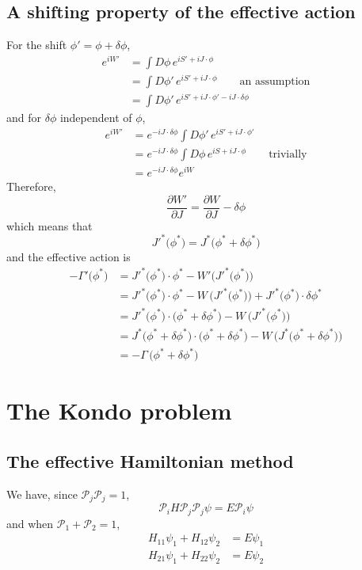 \documentclass[12pt, oneside]{book}
\begin{document}
\section*{A shifting property of the effective action}
For the shift $\phi'=\phi+\delta\phi$,
\begin{align*}
e^{iW'}
&=\int D\phi\,e^{iS'+iJ\cdot\phi}\\
&=\int D\phi'\,e^{iS'+iJ\cdot\phi}\qquad
\text{an assumption}\\
&=\int D\phi'\,e^{iS'+iJ\cdot\phi'-iJ\cdot\delta\phi}
\end{align*}
and for $\delta\phi$ independent of $\phi$,
\begin{align*}
e^{iW'}
&=e^{-iJ\cdot\delta\phi}\int D\phi'\,e^{iS'+iJ\cdot\phi'}\\
&=e^{-iJ\cdot\delta\phi}\int D\phi\,e^{iS+iJ\cdot\phi}\qquad
\text{trivially}\\
&=e^{-iJ\cdot\delta\phi}e^{iW}
\end{align*}
Therefore,
\[
\frac{\partial W'}{\partial J}=\frac{\partial W}{\partial J}-\delta\phi
\]
which means that
\[
J'^*\big(\phi^*\big)=J^*\big(\phi^*+\delta\phi^*\big)
\]
and the effective action is
\begin{align*}
-\Gamma'\big(\phi^*\big)
&=J'^*\big(\phi^*\big)\cdot\phi^*-W'\big(J'^*\big(\phi^*\big)\big)\\
&=J'^*\big(\phi^*\big)\cdot\phi^*-W\,\big(J'^*\big(\phi^*\big)\big)+J'^*\big(\phi^*\big)\cdot\delta\phi^*\\
&=J'^*\big(\phi^*\big)\cdot\big(\phi^*+\delta\phi^*\big)-W\,\big(J'^*\big(\phi^*\big)\big)\\
&=J^*\big(\phi^*+\delta\phi^*\big)\cdot\big(\phi^*+\delta\phi^*\big)-W\,\big(J^*\big(\phi^*+\delta\phi^*\big)\big)\\
&=-\Gamma\,\big(\phi^*+\delta\phi^*\big)
\end{align*}

\chapter{The Kondo problem}
\section*{The effective Hamiltonian method}
We have, since $\mathcal{P}_j\mathcal{P}_j=1$,
\[
\mathcal{P}_iH\mathcal{P}_j\mathcal{P}_j\psi=E\mathcal{P}_i\psi
\]
and when $\mathcal{P}_1+\mathcal{P}_2=1$,
\begin{align*}
H_{11}\psi_1+H_{12}\psi_2&=E\psi_1\\
H_{21}\psi_1+H_{22}\psi_2&=E\psi_2
\end{align*}
\end{document}

